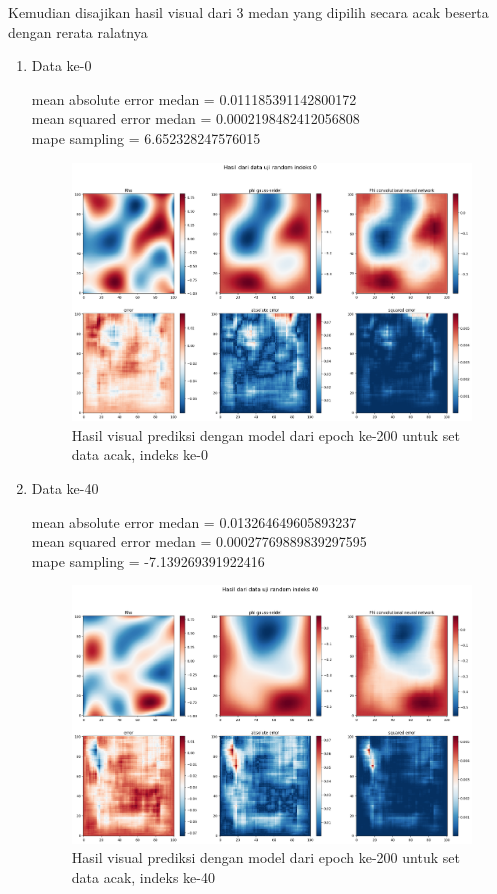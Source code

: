 Kemudian disajikan hasil visual dari 3 medan yang dipilih secara acak beserta dengan rerata ralatnya
\begin{enumerate}
    \item Data ke-0
    
    mean absolute error medan =  0.011185391142800172\\
    mean squared error medan = 0.0002198482412056808\\
    mape sampling =  6.652328247576015
    \begin{figure}[h!]
    \centering
    \includegraphics[width=12cm]{gambar/0_200_acak.png}
    \caption{Hasil visual prediksi dengan model dari epoch ke-200 untuk set data acak, indeks ke-0}
    \label{0_200_acak}
    \end{figure}

    \item Data ke-40

    mean absolute error medan =  0.013264649605893237\\
    mean squared error medan =  0.00027769889839297595\\
    mape sampling =  -7.139269391922416
    \begin{figure}[h!]
    \centering
    \includegraphics[width=12cm]{gambar/40_200_acak.png}
    \caption{Hasil visual prediksi dengan model dari epoch ke-200 untuk set data acak, indeks ke-40}
    \label{40_200_acak}
    \end{figure}


\end{enumerate}
